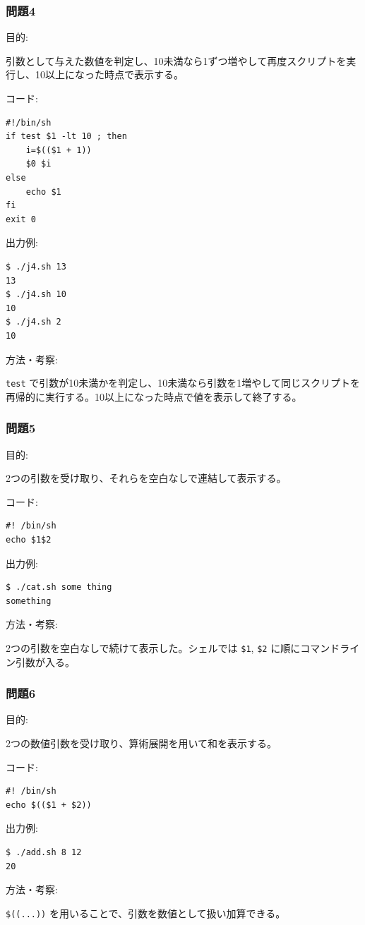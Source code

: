 \documentclass[12pt,a4paper]{jsarticle}
\begin{document}
\subsubsection*{問題4}
目的:\par
引数として与えた数値を判定し、10未満なら1ずつ増やして再度スクリプトを実行し、10以上になった時点で表示する。

コード:\par
\begin{lstlisting}
#!/bin/sh
if test $1 -lt 10 ; then
    i=$(($1 + 1))
    $0 $i
else
    echo $1
fi
exit 0
\end{lstlisting}
出力例:\par
\begin{lstlisting}
$ ./j4.sh 13
13
$ ./j4.sh 10
10
$ ./j4.sh 2
10
\end{lstlisting}
方法・考察:\par
\texttt{test} で引数が10未満かを判定し、10未満なら引数を1増やして同じスクリプトを再帰的に実行する。10以上になった時点で値を表示して終了する。

\vspace{0.6cm}

\subsubsection*{問題5}
目的:\par
2つの引数を受け取り、それらを空白なしで連結して表示する。

コード:\par
\begin{lstlisting}
#! /bin/sh
echo $1$2
\end{lstlisting}
出力例:\par
\begin{lstlisting}
$ ./cat.sh some thing
something
\end{lstlisting}
方法・考察:\par
2つの引数を空白なしで続けて表示した。シェルでは \texttt{\$1}, \texttt{\$2} に順にコマンドライン引数が入る。

\vspace{0.6cm}

\subsubsection*{問題6}
目的:\par
2つの数値引数を受け取り、算術展開を用いて和を表示する。

コード:\par
\begin{lstlisting}
#! /bin/sh
echo $(($1 + $2))
\end{lstlisting}
出力例:\par
\begin{lstlisting}
$ ./add.sh 8 12
20
\end{lstlisting}
方法・考察:\par
\texttt{\$((...))} を用いることで、引数を数値として扱い加算できる。
\end{document}
